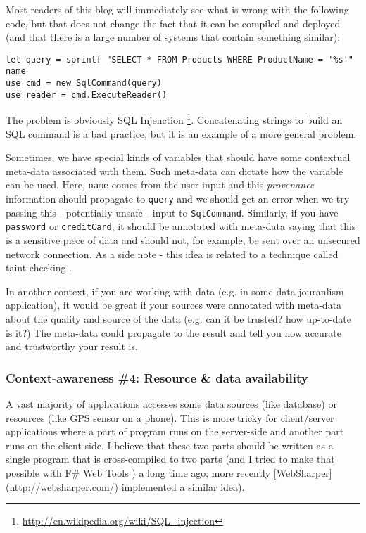 Most readers of this blog will immediately see what is wrong with the following code, but that
does not change the fact that it can be compiled and deployed (and that there is a large number
of systems that contain something similar):

\begin{verbatim}
let query = sprintf "SELECT * FROM Products WHERE ProductName = '%s'" name
use cmd = new SqlCommand(query)
use reader = cmd.ExecuteReader()
\end{verbatim}

The problem is obviously SQL Injenction \footnote{\url{http://en.wikipedia.org/wiki/SQL_injection}}. 
Concatenating strings to build an SQL command is a bad practice, but it is an example of a more general problem.

Sometimes, we have special kinds of variables that should have some contextual meta-data associated
with them. Such meta-data can dictate how the variable can be used. Here, \texttt{name} comes from the user
input and this \emph{provenance} information should propagate to \texttt{query} and we should get an error when
we try passing this - potentially unsafe - input to \texttt{SqlCommand}. Similarly, if you have \texttt{password} or
\texttt{creditCard}, it should be annotated with meta-data saying that this is a sensitive piece of data and
should not, for example, be sent over an unsecured network connection.
As a side note - this idea is related to a technique called taint checking \cite{xx}.

In another context, if you are working with data (e.g. in some data jouranlism application), it would be
great if your sources were annotated with meta-data about the quality and source of the data (e.g.
can it be trusted? how up-to-date is it?) The meta-data could propagate to the result and tell you how
accurate and trustworthy your result is.


\subsubsection{Context-awareness \#4: Resource \& data availability}

A vast majority of applications accesses some data sources (like database) or resources
(like GPS sensor on a phone). This is more tricky for client/server applications where a part
of program runs on the server-side and another part runs on the client-side. I believe that 
these two parts should be written as a single program that is cross-compiled to two parts 
(and I tried to make that possible with F\# Web Tools \cite{xx})
a long time ago; more recently [WebSharper](http://websharper.com/) implemented a similar idea).

